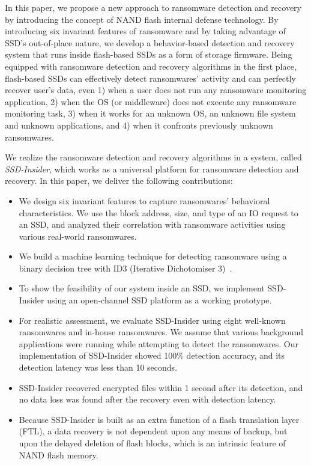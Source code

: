 \documentclass[conference]{IEEEtran}
\newcommand{\ours}{SSD-Insider}
\begin{document}
In this paper, we propose a new approach to ransomware detection
and recovery by introducing the concept of NAND flash internal
defense technology.  By introducing six invariant features of
ransomware and by taking advantage of SSD's out-of-place nature, we
develop a behavior-based detection and recovery system that runs
inside flash-based SSDs as a form of storage firmware.  Being
equipped with ransomware detection and recovery algorithms in the
first place, flash-based SSDs can effectively detect ransomwares'
activity and can perfectly recover user's data, even
1) when a user does not run any ransomware monitoring application,
2) when the OS (or middleware) does not execute any ransomware monitoring task,
3) when it works for an unknown OS, an unknown file system and unknown applications, and
4) when it confronts previously unknown ransomwares.

We realize the ransomware detection and recovery algorithms in a
system, called \textit{SSD-Insider}, which works as a universal
platform for ransomware detection and recovery. In this paper, we deliver the
following contributions:
\begin{itemize}
\item We design six invariant features to capture ransomwares'
behavioral characteristics. We use the block address, size, and
type of an IO request to an SSD, and analyzed their correlation
with ransomware activities using various
real-world ransomwares.
\item We build a machine learning technique for detecting ransomware using a binary decision tree
with ID3 (Iterative Dichotomiser 3)~\cite{quinlan86}.
\item To show the feasibility of our system inside an SSD, we
implement \ours{} using an open-channel SSD platform as a working
prototype.
\item For realistic assessment, we evaluate \ours{} using eight
well-known ransomwares and in-house ransomwares. We assume
that various background applications were running while attempting to detect the ransomwares.  Our
implementation of \ours{} showed 100\% detection accuracy, and its
detection latency was less than 10 seconds. 
\item \ours{} recovered encrypted files within 1 second after its
detection, and no data loss was found after the recovery even with
detection latency.
\item Because \ours{} is built as an extra function of a flash
translation layer (FTL), a data recovery is not dependent upon any
means of backup, but upon the delayed deletion of flash blocks, which is
an intrinsic feature of NAND flash memory.
\end{itemize}
\end{document}
